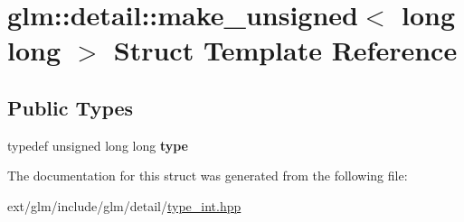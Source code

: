 \hypertarget{structglm_1_1detail_1_1make__unsigned_3_01long_01long_01_4}{\section{glm\-:\-:detail\-:\-:make\-\_\-unsigned$<$ long long $>$ Struct Template Reference}
\label{structglm_1_1detail_1_1make__unsigned_3_01long_01long_01_4}
}
\subsection*{Public Types}
\begin{DoxyCompactItemize}
\item 
\hypertarget{structglm_1_1detail_1_1make__unsigned_3_01long_01long_01_4_adb9a738bcdd4b53058383168bb8585b1}{typedef unsigned long long {\bfseries type}}\label{structglm_1_1detail_1_1make__unsigned_3_01long_01long_01_4_adb9a738bcdd4b53058383168bb8585b1}

\end{DoxyCompactItemize}


The documentation for this struct was generated from the following file\-:\begin{DoxyCompactItemize}
\item 
ext/glm/include/glm/detail/\hyperlink{type__int_8hpp}{type\-\_\-int.\-hpp}\end{DoxyCompactItemize}
